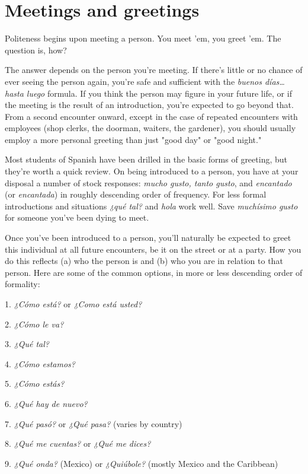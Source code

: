 \documentclass[14pt,a4paper,oneside]{memoir}
\newcommand{\bsk}{\vspace{20pt}}
\begin{document}
\section{Meetings and greetings}

Politeness begins upon meeting a person. You meet 'em, you
greet 'em. The question is, how?

The answer depends on the person you're meeting. If there's
little or no chance of ever seeing the person again, you're safe and sufficient with the \emph{buenos días\ldots{} hasta luego} formula. If you think the
person may figure in your future life, or if the meeting is the result of
an introduction, you're expected to go beyond that. From a second encounter onward, except in the case of repeated encounters with employees (shop clerks, the doorman, waiters, the gardener), you should
usually employ a more personal greeting than just "good day" or "good
night."

Most students of Spanish have been drilled in the basic forms
of greeting, but they're worth a quick review. On being introduced to a
person, you have at your disposal a number of stock responses: \emph{mucho
gusto, tanto gusto}, and \emph{encantado} (or \emph{encantada}) in roughly descending order of frequency. For less formal introductions and situations
\emph{¿qué tal?} and \emph{hola} work well. Save \emph{muchísimo gusto} for someone
you've been dying to meet.

Once you've been introduced to a person, you'll naturally be
expected to greet this individual at all future encounters, be it on the
street or at a party. How you do this reflects (a) who the person is and
(b) who you are in relation to that person. Here are some of the common options, in more or less descending order of formality:

\bsk

1. \emph{¿Cómo está?} or \emph{¿Como está usted?}

2. \emph{¿Cómo le va?}

3. \emph{¿Qué tal?}

4. \emph{¿Cómo estamos?}

5. \emph{¿Cómo estás?}

6. \emph{¿Qué hay de nuevo?}

7. \emph{¿Qué pasó?} or \emph{¿Qué pasa?} (varies by country)

8. \emph{¿Qué me cuentas?} or \emph{¿Qué me dices?}

9. \emph{¿Qué onda?} (Mexico) or \emph{¿Quiúbole?} (mostly Mexico and
the Caribbean)
\end{document}
